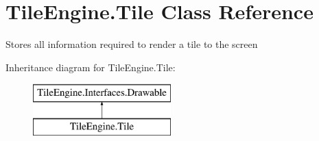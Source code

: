 \hypertarget{class_tile_engine_1_1_tile}{\section{Tile\-Engine.\-Tile Class Reference}
\label{class_tile_engine_1_1_tile}
}


Stores all information required to render a tile to the screen  


Inheritance diagram for Tile\-Engine.\-Tile\-:\begin{figure}[H]
\begin{center}
\leavevmode
\includegraphics[height=2.000000cm]{class_tile_engine_1_1_tile}
\end{center}
\end{figure}
